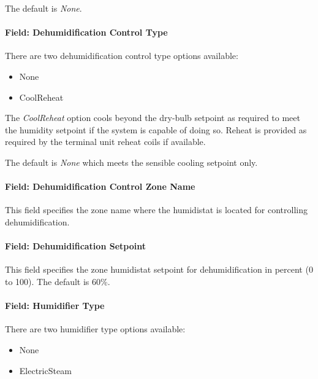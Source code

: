 The default is \emph{None}.

\paragraph{Field: Dehumidification Control Type}\label{field-dehumidification-control-type-4}

There are two dehumidification control type options available:

\begin{itemize}
\item
  None
\item
  CoolReheat
\end{itemize}

The \emph{CoolReheat} option cools beyond the dry-bulb setpoint as required to meet the humidity setpoint if the system is capable of doing so. Reheat is provided as required by the terminal unit reheat coils if available.

The default is \emph{None} which meets the sensible cooling setpoint only.

\paragraph{Field: Dehumidification Control Zone Name}\label{field-dehumidification-control-zone-name-3}

This field specifies the zone name where the humidistat is located for controlling dehumidification.

\paragraph{Field: Dehumidification Setpoint}\label{field-dehumidification-setpoint-3}

This field specifies the zone humidistat setpoint for dehumidification in percent (0 to 100). The default is 60\%.

\paragraph{Field: Humidifier Type}\label{field-humidifier-type-4}

There are two humidifier type options available:

\begin{itemize}
\item
  None
\item
  ElectricSteam
\end{itemize}

